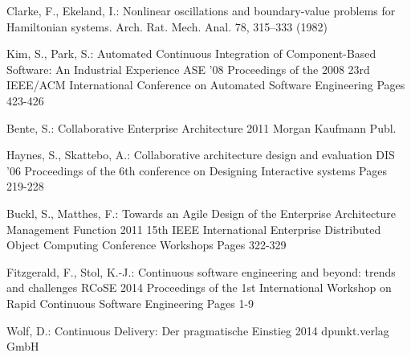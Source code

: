 \documentclass{llncs}
\begin{document}
\begin{thebibliography}{1}
Clarke, F., Ekeland, I.:
Nonlinear oscillations and boundary-value problems for
Hamiltonian systems.
Arch. Rat. Mech. Anal. 78, 315--333 (1982)

Kim, S., Park, S.:
Automated Continuous Integration of Component-Based Software: An Industrial Experience
ASE '08 Proceedings of the 2008 23rd IEEE/ACM International Conference on Automated Software Engineering
Pages 423-426

Bente, S.:
Collaborative Enterprise Architecture
2011 Morgan Kaufmann Publ.

Haynes, S., Skattebo, A.:
Collaborative architecture design and evaluation
DIS '06 Proceedings of the 6th conference on Designing Interactive systems
Pages 219-228

Buckl, S., Matthes, F.:
Towards an Agile Design of the Enterprise Architecture Management Function
2011 15th IEEE International Enterprise Distributed Object Computing Conference Workshops
Pages 322-329

Fitzgerald, F., Stol, K.-J.:
Continuous software engineering and beyond: trends and challenges
RCoSE 2014 Proceedings of the 1st International Workshop on Rapid Continuous Software Engineering
Pages 1-9

Wolf, D.:
Continuous Delivery: Der pragmatische Einstieg
2014 dpunkt.verlag GmbH

%
\end{thebibliography}
\end{document}
